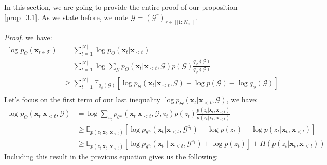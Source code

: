 In this section, we are going to provide the entire proof of our proposition \ref{prop_3.1}. As we state before, we note $\mathcal{G}=(\mathcal{G}^r)_{r \in [|1:N_w|]}$.

\textit{Proof.} we have:
\begin{equation*}
  \begin{aligned}
\log p_\Theta\left(\boldsymbol{x}_{t \in \mathcal{T}}\right) 
& = \sum_{t=1}^{|\mathcal{T}|}\log p_\Theta\left(\boldsymbol{x}_{t}|\boldsymbol{x}_{<t}\right)\\ 
& = \sum_{t=1}^{|\mathcal{T}|}\log \sum_{\mathcal{G}} p_\Theta\left(\boldsymbol{x}_{t}|\boldsymbol{x}_{<t}, \mathcal{G}\right)p(\mathcal{G}) \frac{q_{\phi}(\mathcal{G})}{q_{\phi}(\mathcal{G})}\\ 
& \geq \sum_{t=1}^{|\mathcal{T}|} \mathbb{E}_{q_\phi\left(\mathcal{G}\right)} \left[\log p_\Theta\left(\boldsymbol{x}_{t}|\boldsymbol{x}_{<t}, \mathcal{G}\right)+ \log p(\mathcal{G}) - \log q_{\phi}(\mathcal{G})\right]\\ 
\end{aligned} 
\end{equation*}
Let's focus on the first term of our last inequality $\log p_\Theta\left(\boldsymbol{x}_{t}|\boldsymbol{x}_{<t}, \mathcal{G}\right)$, we have:
\begin{equation*}
    \begin{aligned}
        \log p_\Theta\left(\boldsymbol{x}_{t}|\boldsymbol{x}_{<t}, \mathcal{G}\right) &= \log \sum_{z_t} p_{\theta^{z_t}}\left(\boldsymbol{x}_{t}|\boldsymbol{x}_{<t}, \mathcal{G}, z_t\right) p(z_t) \frac{p(z_t|\boldsymbol{x}_t, \boldsymbol{x}_{<t})}{p(z_t|\boldsymbol{x}_t, \boldsymbol{x}_{<t})}\\
        &\geq \mathbb { E } _ { p( z_t  | \boldsymbol{x}_t, \boldsymbol{x}_{<t}) }\left[ \log p_{\theta^{z_t}}\left(\boldsymbol{x}_{t}|\boldsymbol{x}_{<t}, \mathcal{G}^{z_t}\right) + \log p(z_t) - \log p( z_t  | \boldsymbol{x}_t, \boldsymbol{x}_{<t}) \right]\\
        & \geq \mathbb { E } _ { p( z_t  | \boldsymbol{x}_t, \boldsymbol{x}_{<t}) } \left[\log p_{\theta^{z_t}}\left(\boldsymbol{x}_t\mid \boldsymbol{x}_{<t}, \mathcal{G}^{z_t}\right)+\log p\left(z_t\right)\right] + H\left(p( z_t  | \boldsymbol{x}_t, \boldsymbol{x}_{<t})\right)\
    \end{aligned}
\end{equation*}
Including this result in the previous equation gives us the following:
